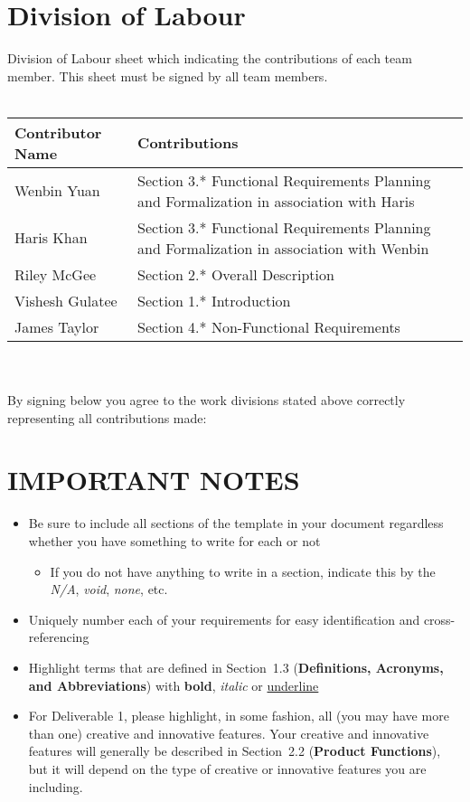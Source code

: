 \documentclass[]{article}
\begin{document}
\section{Division of Labour}
\label{sec:division_of_labour}
Division of Labour sheet which indicating the contributions of each team member. This sheet must be signed by all team members.
\\
\\
\begin{tabular}{ | l | l | }
\hline
	\textbf{Contributor Name} & \textbf{Contributions}  \\
  	\hline
  	Wenbin Yuan & Section 3.* Functional Requirements Planning and Formalization in association with Haris\\ 		\hline
  	Haris Khan & Section 3.* Functional Requirements Planning and Formalization in association with Wenbin \\
  	\hline
  	Riley McGee & Section 2.* Overall Description
  	\\
  	\hline
  	Vishesh Gulatee & Section 1.* Introduction
  	\\
  	\hline
  	James Taylor & Section 4.* Non-Functional Requirements
  	\\
  	\hline
\end{tabular}
\\
\\
By signing below you agree to the work divisions stated above correctly representing all contributions made:

\nocite{MDes}
\nocite{CAQ}
\newpage
\section*{IMPORTANT NOTES}
\begin{itemize}
	\item Be sure to include all sections of the template in your document regardless whether you have something to write for each or not
	\begin{itemize}
		\item If you do not have anything to write in a section, indicate this by the \emph{N/A}, \emph{void}, \emph{none}, etc.
	\end{itemize}
	\item Uniquely number each of your requirements for easy identification and cross-referencing
	\item Highlight terms that are defined in Section~1.3 (\textbf{Definitions, Acronyms, and Abbreviations}) with \textbf{bold}, \emph{italic} or \underline{underline}
	\item For Deliverable 1, please highlight, in some fashion, all (you may have more than one) creative and innovative features. Your creative and innovative features will generally be described in Section~2.2 (\textbf{Product Functions}), but it will depend on the type of creative or innovative features you are including.
\end{itemize}
\end{document}
